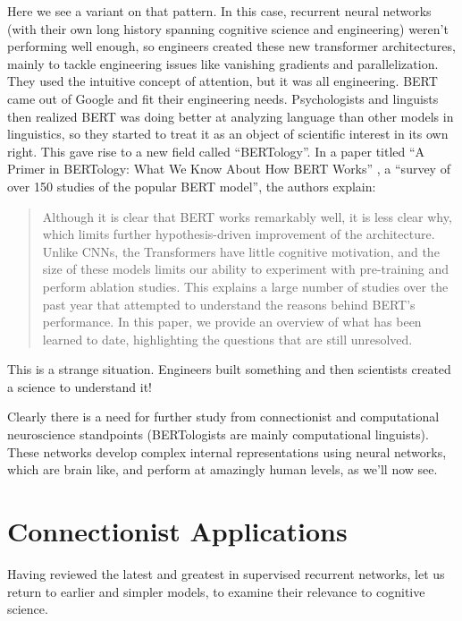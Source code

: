 Here we see a variant on that pattern. In this case, recurrent neural networks (with their own long history spanning cognitive science and engineering) weren't performing well enough, so engineers created these new transformer architectures, mainly to tackle engineering issues like vanishing gradients and parallelization.  They used the intuitive concept of attention, but it was all engineering. BERT came out of Google and fit their engineering needs. Psychologists and linguists then realized  BERT was doing better at analyzing language than other models in linguistics, so they started to treat it as an object of scientific interest in its own right. This gave rise to a new field called ``BERTology''. In a paper titled ``A Primer in BERTology: What We Know About How BERT Works'' \cite{rogers2020primer}, a ``survey of over 150 studies of the popular BERT model'',  the authors explain:
\begin{quote}
Although it is clear that BERT works remarkably well, it is less clear why, which limits further hypothesis-driven improvement of the architecture. Unlike CNNs, the Transformers have little cognitive motivation, and the size of these models limits our ability to experiment with pre-training and perform ablation studies. This explains a large number of studies over the past year that attempted to understand the reasons behind BERT’s performance. In this paper, we provide an overview of what has been learned to date, highlighting the questions that are still unresolved.
\end{quote}
This is a strange situation. Engineers built something and then scientists created a science to understand it!  

Clearly there is a need for further study from connectionist and computational neuroscience standpoints (BERTologists are mainly computational linguists).  These networks develop complex internal representations using neural networks, which are brain like, and perform at amazingly human levels, as we'll now see.


\section{Connectionist Applications}\label{internalRepsRecurrent}

Having reviewed the latest and greatest in supervised recurrent networks, let us return to earlier and simpler models, to examine their relevance to cognitive science.

